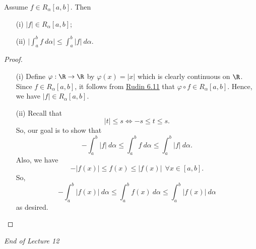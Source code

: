 \begin{theorem}
    Assume \( f \in {R}_{\alpha}[a,b] \). Then
    \begin{enumerate}
        \item[(i)] \( | f |  \in {R}_{\alpha}[a,b] \);
        \item[(ii)] \( \displaystyle \Big| \int_{ a }^{ b }  f  \ d \alpha \Big|  \leq \int_{ a }^{ b }  | f |  \ d \alpha \).
    \end{enumerate}
\end{theorem}
\begin{proof}
\begin{enumerate}
    \item[(i)] Define \( \varphi: \R \to \R  \) by \( \varphi(x) = | x  |  \) which is clearly continuous on \( \R  \). Since \( f \in {R}_{\alpha}[a,b] \), it follows from {\hyperref[Rudin 6.11]{Rudin 6.11}} that \( \varphi \circ f \in {R}_{\alpha}[a,b] \). Hence, we have \( | f |  \in {R}_{\alpha}[a,b]  \).  
    \item[(ii)] Recall that 
        \[  | t  |  \leq s \iff - s \leq t \leq s.  \]
        So, our goal is to show that 
        \[ - \int_{ a }^{ b }  | f  |  \ d \alpha \leq \int_{ a }^{ b }  f  \ d \alpha \leq \int_{ a }^{ b }  | f  |  \ d \alpha. \]
        Also, we have 
        \[ - | f(x) |  \leq f(x) \leq | f(x) |  \ \ \forall x \in [a,b].  \]
        So, 
        \[  -\int_{ a }^{ b }  | f(x) |  \ d \alpha \leq \int_{ a }^{ b }  f(x) \ d \alpha \leq \int_{ a }^{ b }  | f(x) |  \ d \alpha \]
        as desired.
\end{enumerate}
\end{proof}


\begin{center}
    \textit{End of Lecture 12} 
\end{center}
